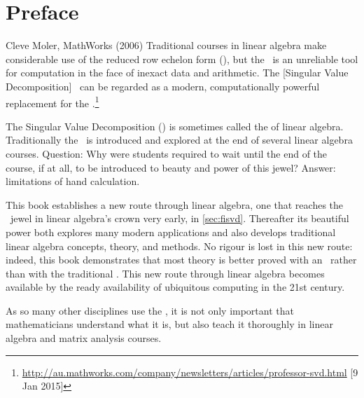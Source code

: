 
\maketitle


\tableofcontents


\chapter*{Preface}


\begin{quoted}{Cleve Moler, MathWorks (2006)}
Traditional courses in linear algebra make considerable use of the reduced row echelon form (\rref), but the \rref\ is an unreliable tool for computation in the face of inexact data and arithmetic. 
The [Singular Value Decomposition] \svd\ can be regarded as a modern, computationally powerful replacement for the \rref.\footnote{\url{http://au.mathworks.com/company/newsletters/articles/professor-svd.html} [9 Jan 2015]}
\end{quoted}

The Singular Value Decomposition (\svd) is sometimes called the \emph{} of linear algebra.
Traditionally the \svd\ is introduced and explored at the end of several linear algebra courses.
Question: Why were students required to wait until the end of the course, if at all, to be introduced to beauty and power of this jewel?
Answer: limitations of hand calculation.

This book establishes a new route through linear algebra, one that reaches the \svd\ jewel in linear algebra's crown very early, in \autoref{sec:fisvd}.
Thereafter its beautiful power both explores many modern applications and also develops traditional linear algebra concepts, theory, and methods.
No rigour is lost in this new route: indeed, this book demonstrates that most theory is better proved with an \svd\ rather than with the traditional \rref.
This new route through linear algebra becomes available by the ready availability of ubiquitous computing in the 21st century.


\begin{quoted}{\cite[p.30]{Turner2014}}
As so many other disciplines use the \svd, it is not only important that mathematicians understand what it is, but also teach it thoroughly in linear algebra and matrix analysis courses.
\end{quoted}









